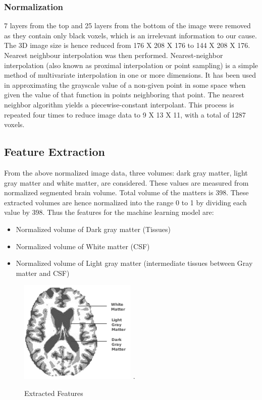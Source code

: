 \documentclass[journal,twoside]{IEEEtran}
\begin{document}
\subsubsection{Normalization}
7 layers from the top and 25 layers from the bottom of the image were removed as they contain only black voxels, which is an irrelevant information to our cause. The 3D image size is hence reduced from 176 X 208 X 176 to 144 X 208 X 176.
Nearest neighbour interpolation was then performed. Nearest-neighbor interpolation (also known as proximal interpolation or point sampling) is a simple method of multivariate interpolation in one or more dimensions. It has been used in approximating the grayscale value of a non-given point in some space when given the value of that function in points neighboring that point. The nearest neighbor algorithm yields a piecewise-constant interpolant. This process is repeated four times to reduce image data to 9 X 13 X 11, with a total of 1287 voxels.
\subsection{Feature Extraction}
From the above normalized image data, three volumes: dark gray matter, light gray matter and white matter, are considered. These values are measured from normalized segmented brain volume. Total volume of the matters is 398. These extracted volumes are hence normalized into the range 0 to 1 by dividing each value by 398. Thus the features for the machine learning model are:
\begin{itemize}
	\item Normalized volume of Dark gray matter (Tissues)
	\item Normalized volume of White matter (CSF)
	\item Normalized volume of Light gray matter (intermediate tissues between Gray matter and CSF)
\end{itemize}
\begin{figure}[h]
\centering
\includegraphics[width=2.2in]{Features.png}
\DeclareGraphicsExtensions.
\caption{Extracted Features}
\end{figure}
\end{document}
